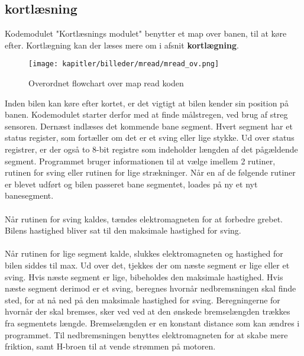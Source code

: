\newpage

\subsection{kortlæsning}

Kodemodulet "Kortlæsnings modulet" benytter et map over banen, til at køre efter. Kortlægning kan der læses mere om i afsnit \textbf{kortlægning}.\\

\begin{figure}[ht]
\centering
\texttt{[image: kapitler/billeder/mread/mread\_ov.png]}
\caption{Overordnet flowchart over map read koden}
\label{fig:mread}
\end{figure}

Inden bilen kan køre efter kortet, er det vigtigt at bilen kender sin position på banen. Kodemodulet starter derfor med at finde målstregen, ved brug af streg sensoren. Dernæst indlæses det kommende bane segment. Hvert segment har et status register, som fortæller om det er et sving eller lige stykke. Ud over status registrer, er der også to 8-bit registre som indeholder længden af det pågældende segment. Programmet bruger informationen til at vælge imellem 2 rutiner, rutinen for sving eller rutinen for lige strækninger. Når en af de følgende rutiner er blevet udført og bilen passeret bane segmentet, loades på ny et nyt banesegment.\\
\\
Når rutinen for sving kaldes, tændes elektromagneten for at forbedre grebet. Bilens hastighed bliver sat til den maksimale hastighed for sving.\\
\\
Når rutinen for lige segment kalde, slukkes elektromagneten og hastighed for bilen siddes til max. Ud over det, tjekkes der om næste segment er lige eller et sving. Hvis næste segment er lige, bibeholdes den maksimale hastighed. Hvis næste segment derimod er et sving, beregnes hvornår nedbremsningen skal finde sted, for at nå ned på den maksimale hastighed for sving. Beregningerne for hvornår der skal bremses, sker ved ved at den ønskede bremselængden trækkes fra segmentets længde. Bremselængden er en konstant distance som kan ændres i programmet. Til nedbremsningen benyttes elektromagneten for at skabe mere friktion, samt H-broen til at vende strømmen på motoren.\\

